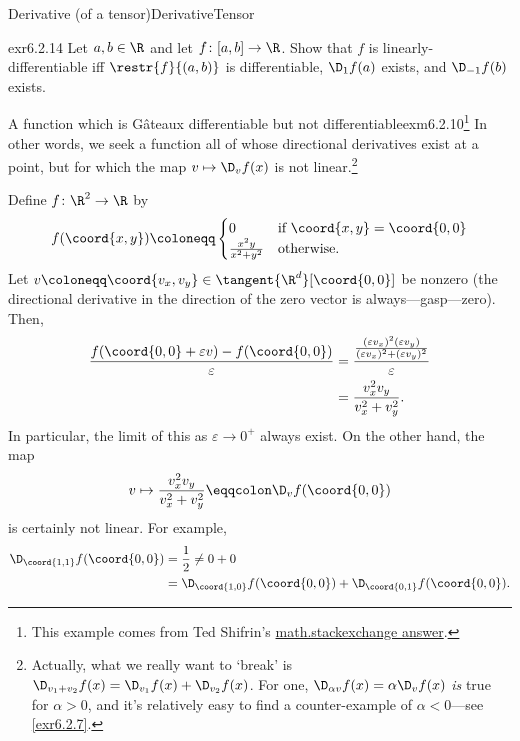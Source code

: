 \begin{mdf}{Derivative (of a tensor)}{DerivativeTensor}
\begin{rmk}
\end{rmk}
\end{mdf}

\begin{exr}{}{exr6.2.14}
Let $a,b\in \R$ and let $f\colon [a,b]\rightarrow \R$.  Show that $f$ is linearly-differentiable iff $\restr{f}{(a,b)}$ is differentiable, $\D _1f(a)$ exists, and $\D _{-1}f(b)$ exists.
\end{exr}
\begin{exm}{A function which is Gâteaux differentiable but not differentiable}{exm6.2.10}\footnote{This example comes from Ted Shifrin's \href{http://math.stackexchange.com/questions/694486/show-that-the-directional-derivative-is-linear-by-definition}{math.stackexchange answer}.}
In other words, we seek a function all of whose directional derivatives exist at a point, but for which the map $v\mapsto \D _vf(x)$ is not linear.\footnote{Actually, what we really want to `break' is $\D _{v_1+v_2}f(x)=\D _{v_1}f(x)+\D _{v_2}f(x)$.  For one, $\D _{\alpha v}f(x)=\alpha \D _vf(x)$ \emph{is} true for $\alpha >0$, and it's relatively easy to find a counter-example of $\alpha <0$---see \cref{exr6.2.7}.}

Define $f\colon \R ^2\rightarrow \R$ by
\begin{equation}
f(\coord{x,y})\coloneqq \begin{cases}0 & \text{if }\coord{x,y}=\coord{0,0} \\ \frac{x^2y}{x^2+y^2} & \text{otherwise.}\end{cases}
\end{equation}
Let $v\coloneqq \coord{v_x,v_y}\in \tangent{\R ^d}[\coord{0,0}]$ be nonzero (the directional derivative in the direction of the zero vector is always---gasp---zero).  Then,
\begin{equation}
\begin{split}
\frac{f(\coord{0,0}+\varepsilon v)-f(\coord{0,0})}{\varepsilon} & =\frac{\frac{(\varepsilon v_x)^2(\varepsilon v_y)}{(\varepsilon v_x)^2+(\varepsilon v_y)^2}}{\varepsilon} \\
& =\frac{v_x^2v_y}{v_x^2+v_y^2}.
\end{split}
\end{equation}
In particular, the limit of this as $\varepsilon \to 0^+$ always exist.  On the other hand, the map
\begin{equation}
v\mapsto \frac{v_x^2v_y}{v_x^2+v_y^2}\eqqcolon \D _vf(\coord{0,0})
\end{equation}
is certainly not linear.  For example,
\begin{equation*}
\begin{split}
\D _{\coord{1,1}}f(\coord{0,0}) & =\frac{1}{2}\neq 0+0 \\
& =\D _{\coord{1,0}}f(\coord{0,0})+\D _{\coord{0,1}}f(\coord{0,0}).
\end{split}
\end{equation*}
\end{exm}
